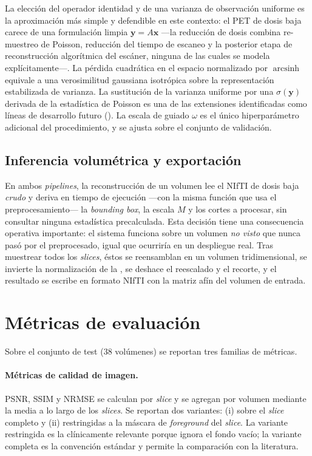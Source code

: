 La elección del operador identidad y de una varianza de observación
uniforme es la aproximación más simple y defendible en este
contexto: el PET de dosis baja carece de una formulación limpia
$\mathbf{y} = A\mathbf{x}$ —la reducción de dosis combina
re-muestreo de Poisson, reducción del tiempo de escaneo y la
posterior etapa de reconstrucción algorítmica del escáner, ninguna
de las cuales se modela explícitamente—. La pérdida cuadrática en
el espacio normalizado por $\operatorname{arcsinh}$ equivale a una
verosimilitud gaussiana isotrópica sobre la representación
estabilizada de varianza. La sustitución de la varianza uniforme
por una $\sigma(\mathbf{y})$ derivada de la estadística de Poisson
es una de las extensiones identificadas como líneas de desarrollo
futuro (). La escala de guiado $\omega$ es
el único hiperparámetro adicional del procedimiento, y se ajusta
sobre el conjunto de validación.

\subsection{Inferencia volumétrica y exportación}
\label{subsec:pet-inferencia-volumetrica}

En ambos \textit{pipelines}, la reconstrucción de un volumen lee el
NIfTI de dosis baja \emph{crudo} y deriva en tiempo de ejecución
—con la misma función que usa el preprocesamiento— la
\textit{bounding box}, la escala $M$ y los cortes a procesar, sin
consultar ninguna estadística precalculada. Esta decisión tiene una
consecuencia operativa importante: el sistema funciona sobre un
volumen \emph{no visto} que nunca pasó por el preprocesado, igual
que ocurriría en un despliegue real. Tras muestrear todos los
\textit{slices}, éstos se reensamblan en un volumen tridimensional,
se invierte la normalización de la , se deshace
el reescalado y el recorte, y el resultado se escribe en formato
NIfTI con la matriz afín del volumen de entrada.

\section{Métricas de evaluación}
\label{sec:pet-metricas}

Sobre el conjunto de test (38 volúmenes) se reportan tres familias
de métricas.

\paragraph{Métricas de calidad de imagen.}
PSNR, SSIM y NRMSE se calculan por \textit{slice} y se agregan
por volumen mediante la media a lo largo de los \textit{slices}.
Se reportan dos variantes: (i) sobre el \textit{slice} completo
y (ii) restringidas a la máscara de \textit{foreground} del
\textit{slice}. La variante restringida es la clínicamente
relevante porque ignora el fondo vacío; la variante completa es
la convención estándar y permite la comparación con la literatura.

